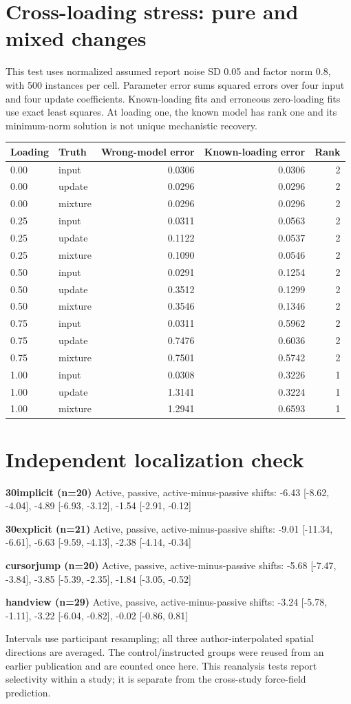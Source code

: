 \documentclass[11pt,a4paper]{article}
\begin{document}
\section{Cross-loading stress: pure and mixed changes}
This test uses normalized assumed report noise SD 0.05 and factor norm 0.8, with 500 instances per cell. Parameter error sums squared errors over four input and four update coefficients. Known-loading fits and erroneous zero-loading fits use exact least squares. At loading one, the known model has rank one and its minimum-norm solution is not unique mechanistic recovery.
\small\begin{longtable}{llrrr}\toprule Loading & Truth & Wrong-model error & Known-loading error & Rank\\\midrule\endhead
0.00 & input & 0.0306 & 0.0306 & 2\\
0.00 & update & 0.0296 & 0.0296 & 2\\
0.00 & mixture & 0.0296 & 0.0296 & 2\\
0.25 & input & 0.0311 & 0.0563 & 2\\
0.25 & update & 0.1122 & 0.0537 & 2\\
0.25 & mixture & 0.1090 & 0.0546 & 2\\
0.50 & input & 0.0291 & 0.1254 & 2\\
0.50 & update & 0.3512 & 0.1299 & 2\\
0.50 & mixture & 0.3546 & 0.1346 & 2\\
0.75 & input & 0.0311 & 0.5962 & 2\\
0.75 & update & 0.7476 & 0.6036 & 2\\
0.75 & mixture & 0.7501 & 0.5742 & 2\\
1.00 & input & 0.0308 & 0.3226 & 1\\
1.00 & update & 1.3141 & 0.3224 & 1\\
1.00 & mixture & 1.2941 & 0.6593 & 1\\
\bottomrule\end{longtable}\normalsize
\section{Independent localization check}
\textbf{30implicit (n=20)} Active, passive, active-minus-passive shifts: -6.43 [-8.62, -4.04], -4.89 [-6.93, -3.12], -1.54 [-2.91, -0.12]\par
\textbf{30explicit (n=21)} Active, passive, active-minus-passive shifts: -9.01 [-11.34, -6.61], -6.63 [-9.59, -4.13], -2.38 [-4.14, -0.34]\par
\textbf{cursorjump (n=20)} Active, passive, active-minus-passive shifts: -5.68 [-7.47, -3.84], -3.85 [-5.39, -2.35], -1.84 [-3.05, -0.52]\par
\textbf{handview (n=29)} Active, passive, active-minus-passive shifts: -3.24 [-5.78, -1.11], -3.22 [-6.04, -0.82], -0.02 [-0.86, 0.81]\par
Intervals use participant resampling; all three author-interpolated spatial directions are averaged. The control/instructed groups were reused from an earlier publication and are counted once here. This reanalysis tests report selectivity within a study; it is separate from the cross-study force-field prediction.
\end{document}

